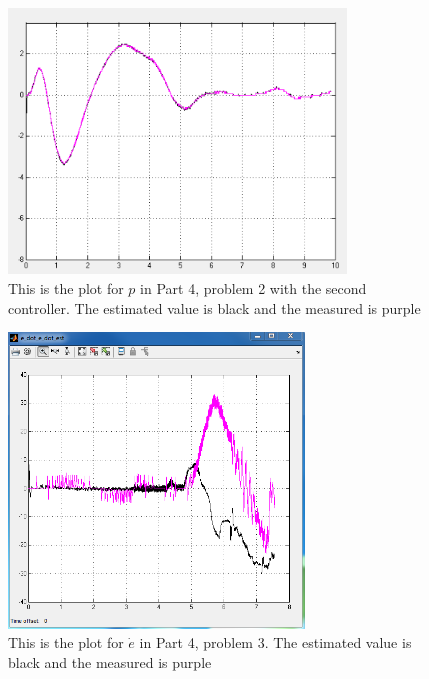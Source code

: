 \begin{figure}[H]
    \centering
    \includegraphics[width=0.8\textwidth]{figures/P4_p22_p}
    \caption{This is the plot for $p$ in Part 4, problem 2 with the second controller. The estimated value is black and the measured is purple}
    \label{fig:P4p22_p}
\end{figure}

\begin{figure}[H]
    \centering
    \includegraphics[width=0.7\textwidth]{figures/P4p3-e_dot}
    \caption{This is the plot for $\dot{e}$ in Part 4, problem 3. The estimated value is black and the measured is purple}
    \label{fig:P4p3-e_dot}
\end{figure}

